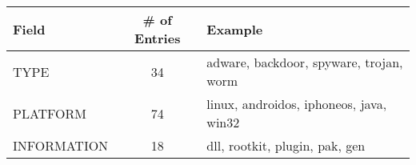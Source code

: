 \begin{tabular}{|l|c|l|}
    \hline
    \textbf{Field} &\textbf{\# of Entries} &\textbf{Example}\\
    \hline
    TYPE           & 34              & adware, backdoor, spyware, trojan, worm\\
    PLATFORM       & 74              & linux, androidos, iphoneos, java, win32\\
    INFORMATION    & 18              & dll, rootkit, plugin, pak, gen\\
    \hline
\end{tabular}
